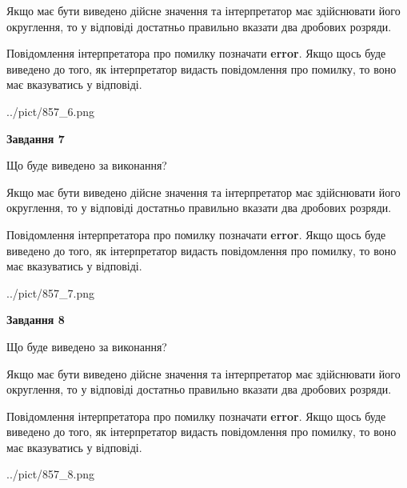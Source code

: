 \documentclass[12pt, ukrainian]{article}
\begin{document}
{\begin {Large}
Якщо має бути виведено дійсне значення та інтерпретатор має здійснювати його округлення, 
то у відповіді достатньо правильно вказати два дробових розряди.

Повідомлення інтерпретатора про помилку позначати \textbf{error}.
Якщо щось буде виведено до того, як інтерпретатор видасть повідомлення про помилку, 
то воно має вказуватись у відповіді. \par

\begin{center}
	{../pict/857_6.png}
\end{center}
\newpage

{\begin {center}\textbf{Завдання 7}\end {center}}\par
Що буде виведено за виконання? \par

Якщо має бути виведено дійсне значення та інтерпретатор має здійснювати його округлення, 
то у відповіді достатньо правильно вказати два дробових розряди.

Повідомлення інтерпретатора про помилку позначати \textbf{error}.
Якщо щось буде виведено до того, як інтерпретатор видасть повідомлення про помилку, 
то воно має вказуватись у відповіді. \par

\begin{center}
	{../pict/857_7.png}
\end{center}
\newpage

{\begin {center}\textbf{Завдання 8}\end {center}}\par
Що буде виведено за виконання? \par

Якщо має бути виведено дійсне значення та інтерпретатор має здійснювати його округлення, 
то у відповіді достатньо правильно вказати два дробових розряди.

Повідомлення інтерпретатора про помилку позначати \textbf{error}.
Якщо щось буде виведено до того, як інтерпретатор видасть повідомлення про помилку, 
то воно має вказуватись у відповіді. \par

\begin{center}
	{../pict/857_8.png}
\end{center}
\newpage


\end{Large}}
\end{document}
